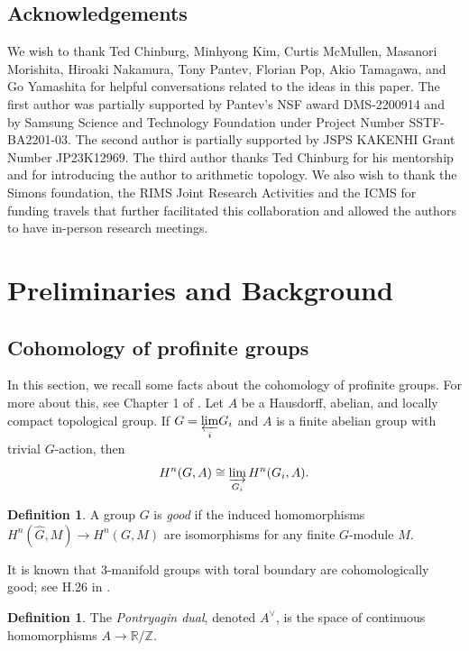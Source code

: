 \documentclass{amsart}
\theoremstyle{plain}
\theoremstyle{definition}
\newtheorem{Def}[theorem]{Definition}
\theoremstyle{plain}
\theoremstyle{plain}
\theoremstyle{plain}
\theoremstyle{remark}
\theoremstyle{remark}
\theoremstyle{plain}
\theoremstyle{definition}
\theoremstyle{plain}
\theoremstyle{plain}
\theoremstyle{plain}
\numberwithin{equation}{section}
\begin{document}
\subsection*{Acknowledgements}
We wish to thank Ted Chinburg, Minhyong Kim, Curtis McMullen, Masanori Morishita, Hiroaki Nakamura, Tony Pantev, Florian Pop, Akio Tamagawa, and Go Yamashita for helpful conversations related to the ideas in this paper. The first author was partially supported by Pantev’s NSF award DMS-2200914 and by Samsung Science and Technology Foundation under Project Number SSTF-BA2201-03. The second author is partially supported by JSPS KAKENHI Grant Number JP23K12969. The third author thanks Ted Chinburg for his mentorship and for introducing the author to arithmetic topology. We also wish to thank the Simons foundation, the RIMS Joint Research Activities and the ICMS for funding travels that further facilitated this collaboration and allowed the authors to have in-person research meetings. 

\section{Preliminaries and Background}  
\label{sec:background}

\subsection{Cohomology of profinite groups}

In this section, we recall some facts about the cohomology of profinite groups. For more about this, see Chapter 1 of \cite{neukirch2013cohomology}. Let $A$ be a Hausdorff, abelian, and locally compact topological group. If $G=\underset{i}{\varprojlim}G_i$ and $A$ is a finite abelian group with trivial $G$-action, then
\begin{equation}\label{eq:limcohom}
    H^n(G, A) \cong \varinjlim_{G_i} H^n(G_i, A).
\end{equation}

\begin{Def}
A group $G$ is \emph{good} if the induced homomorphisms $H^n(\widehat{G}, M) \to H^n(G, M)$ are isomorphisms for any finite $G$-module $M$.
\end{Def}

It is known that 3-manifold groups with toral boundary are cohomologically good; see H.26 in \cite{3groups}.

\begin{Def}
The \emph{Pontryagin dual}, denoted $A^\vee$, is the space of continuous homomorphisms $A \to \mathbb{R}/\mathbb{Z}$.
\end{Def}
\end{document}
